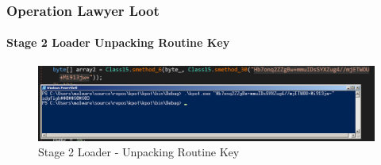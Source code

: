 \documentclass[aspectratio=169]{beamer}
\begin{document}
{
\begin{frame}
  \frametitle{Operation Lawyer Loot}
  \framesubtitle{Stage 2 Loader Unpacking Routine Key}
  \begin{center}
    \begin{figure}
      \includegraphics[width=14cm]{stage-2-unpacking-key}
      \caption{Stage 2 Loader - Unpacking Routine Key}
    \end{figure}
  \end{center}
\end{frame}
}
\end{document}
